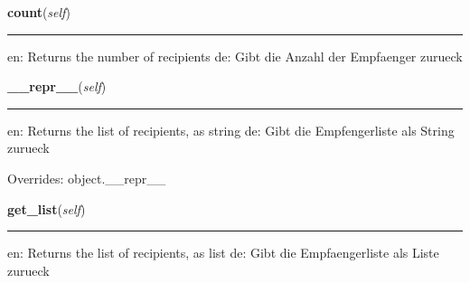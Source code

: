     \label{cuon:simplemail:Recipients:count}

    \vspace{0.5ex}

\hspace{.8\funcindent}\begin{boxedminipage}{\funcwidth}

    \raggedright \textbf{count}(\textit{self})

    \vspace{-1.5ex}

    \rule{\textwidth}{0.5\fboxrule}
\setlength{\parskip}{2ex}
    en: Returns the number of recipients de: Gibt die Anzahl der Empfaenger
    zurueck

\setlength{\parskip}{1ex}
    \end{boxedminipage}

    \vspace{0.5ex}

\hspace{.8\funcindent}\begin{boxedminipage}{\funcwidth}

    \raggedright \textbf{\_\_repr\_\_}(\textit{self})

    \vspace{-1.5ex}

    \rule{\textwidth}{0.5\fboxrule}
\setlength{\parskip}{2ex}
    en: Returns the list of recipients, as string de: Gibt die 
    Empfengerliste als String zurueck

\setlength{\parskip}{1ex}
      Overrides: object.\_\_repr\_\_

    \end{boxedminipage}

    \label{cuon:simplemail:Recipients:get_list}

    \vspace{0.5ex}

\hspace{.8\funcindent}\begin{boxedminipage}{\funcwidth}

    \raggedright \textbf{get\_list}(\textit{self})

    \vspace{-1.5ex}

    \rule{\textwidth}{0.5\fboxrule}
\setlength{\parskip}{2ex}
    en: Returns the list of recipients, as list de: Gibt die 
    Empfaengerliste als Liste zurueck

\setlength{\parskip}{1ex}
    \end{boxedminipage}


